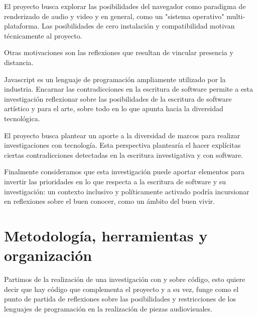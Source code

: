 El proyecto busca explorar las posibilidades del navegador como paradigma de renderizado de audio y video y en general, como un "sistema operativo" multi-plataforma. Las posibilidades de cero instalación y compatibilidad motivan técnicamente al proyecto.

Otras motivaciones son las reflexiones que resultan de vincular presencia y distancia.


Javascript es un lenguaje de programación ampliamente utilizado por la industria. Encarnar las contradicciones en la escritura de software permite a esta investigación reflexionar sobre las posibilidades de la escritura de software artístico y para el arte, sobre todo en lo que apunta hacia la diversidad tecnológica.

El proyecto busca plantear un aporte a la diversidad de marcos para realizar investigaciones con tecnología. Esta perspectiva plantearía el hacer explícitas ciertas contradicciones detectadas en la escritura investigativa y con software. 

Finalmente consideramos que esta investigación puede aportar elementos para invertir las prioridades en lo que respecta a la escritura de software y su investigación: un contexto inclusivo y políticamente activado podría incursionar en reflexiones sobre el buen conocer, como un ámbito del buen vivir. 


\section{Metodología, herramientas y organización}



Partimos de la realización de una investigación con y sobre código, esto quiere decir que hay código que complementa el proyecto y a su vez, funge como el punto de partida de reflexiones sobre las posibilidades y restricciones de los lenguajes de programación en la realización de piezas audiovisuales.


